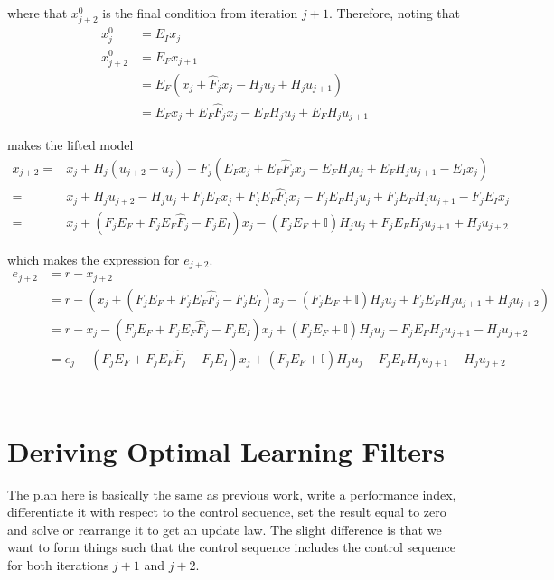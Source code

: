 \documentclass[landscape]{article}
\begin{document}
where that $x^0_{j+2}$ is the final condition from iteration $j+1$.  Therefore, noting that 
\begin{align}
x^0_{j}   &= E_I x_j \\
x^0_{j+2} &= E_F x_{j+1} \\
& = E_F \left(x_j + \hat{F}_j x_j - H_j u_j + H_j u_{j+1} \right)\\
& = E_F x_j + E_F \hat{F}_j x_j - E_F H_j u_j + E_F H_j u_{j+1}
\end{align}

makes the lifted model
\begin{align}
x_{j+2} 
= & x_j + H_j \left(u_{j+2} - u_{j}\right) + F_j\left( E_F x_j + E_F \hat{F}_j x_j - E_F H_j u_j + E_F H_j u_{j+1} - E_I x_j\right) \\
= & x_j + H_j u_{j+2} - H_j u_{j} + F_j E_F x_j + F_j E_F \hat{F}_j x_j - F_j E_F H_j u_j + F_j E_F H_j u_{j+1} - F_j E_I x_j \\
= & x_j + \left(F_j E_F + F_j E_F \hat{F}_j - F_j E_I\right)x_j - \left(F_j E_F +\mathbb{I} \right) H_j u_j + F_j E_F H_j u_{j+1}   + H_j u_{j+2}
\end{align}

which makes the expression for $e_{j+2}$.
\begin{align}
e_{j+2} 
& = r - x_{j+2}\\
& = r - \left(x_j + \left(F_j E_F + F_j E_F \hat{F}_j - F_j E_I\right)x_j - \left(F_j E_F +\mathbb{I} \right) H_j u_j + F_j E_F H_j u_{j+1}   + H_j u_{j+2}\right) \\
& = r - x_j - \left(F_j E_F + F_j E_F \hat{F}_j - F_j E_I\right)x_j + \left(F_j E_F +\mathbb{I} \right) H_j u_j - F_j E_F H_j u_{j+1}   - H_j u_{j+2} \\
& = e_j - \left(F_j E_F + F_j E_F \hat{F}_j - F_j E_I\right)x_j + \left(F_j E_F +\mathbb{I} \right) H_j u_j - F_j E_F H_j u_{j+1}   - H_j u_{j+2} \\
\end{align}\

\section{Deriving Optimal Learning Filters}
The plan here is basically the same as previous work, write a performance index, differentiate it with respect to the control sequence, set the result equal to zero and solve or rearrange it to get an update law.  The slight difference is that we want to form things such that the control sequence includes the control sequence for both iterations $j+1$ and $j+2$.
\end{document}
